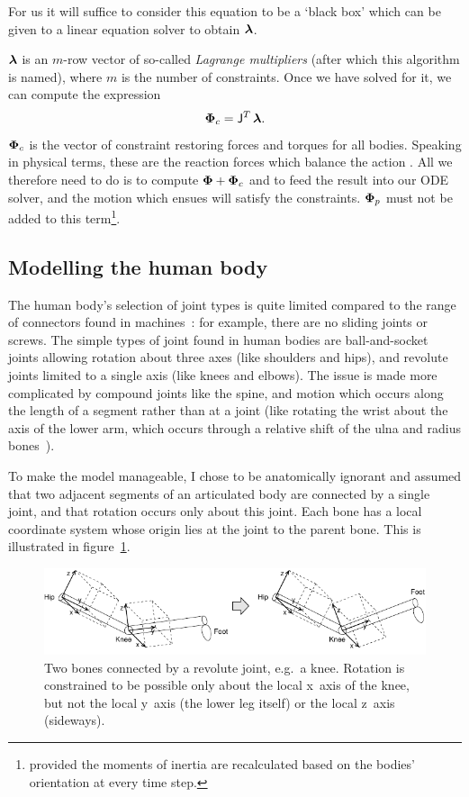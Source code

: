 For us it will suffice to consider this equation to be a `black box' which can be
given to a linear equation solver to obtain $\ve{\lambda}$.

$\ve{\lambda}$ is an $m$-row vector of so-called \emph{Lagrange multipliers} (after which this
algorithm is named), where $m$ is the number of constraints. Once we have solved for it, we can
compute the expression
\begin{equation} \label{lagrangeSolution}
\ve{\Phi}_c = \m{J}^T\,\ve{\lambda}.
\end{equation}
$\ve{\Phi}_c$ is the vector of constraint restoring forces and torques for all bodies.
Speaking in physical terms, these are the reaction forces which balance the action \ve{\Phi}.
All we therefore need to do is to compute $\ve{\Phi} + \ve{\Phi}_c$ and to feed the result into
our ODE solver, and the motion which ensues will satisfy the constraints.
$\ve{\Phi}_p$ must not be added to this term\footnote{provided the moments of inertia are
recalculated based on the bodies' orientation at every time step.}.


\subsection{Modelling the human body}

The human body's selection of joint types is quite limited compared to the range of connectors
found in machines~\cite{Kalra:95}: for example, there are no sliding joints or screws. The simple
types of joint found in human bodies are ball-and-socket joints allowing rotation about three axes
(like shoulders and hips), and revolute joints limited to a single axis (like knees and elbows).
The issue is made more complicated by compound joints like the spine, and motion which occurs
along the length of a segment rather than at a joint (like rotating the wrist about the axis of
the lower arm, which occurs through a relative shift of the ulna and radius
bones~\cite{Anatomy:03}).

To make the model manageable, I chose to be anatomically ignorant and assumed that two adjacent
segments of an articulated body are connected by a single joint, and that rotation occurs only
about this joint. Each bone has a local coordinate system whose origin lies at the joint to the
parent bone. This is illustrated in figure~\ref{jointsFigure}.

\begin{figure}
\centerline{\includegraphics{figures/joint1}}
\caption{Two bones connected by a revolute joint, e.g.\ a knee. Rotation is constrained to be
    possible only about the local x~axis of the knee, but not the local y~axis
    (the lower leg itself) or the local z~axis (sideways).\label{jointsFigure}}
\end{figure}

